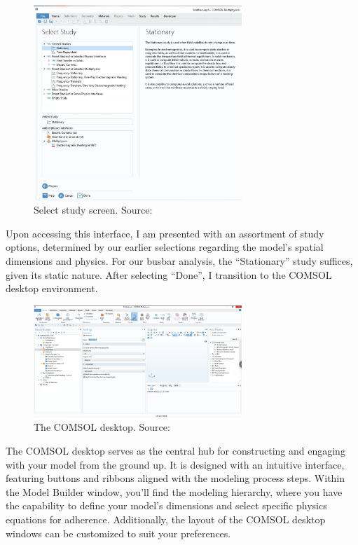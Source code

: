 \begin{figure}[H]
  \centering
  \includegraphics[width=0.7\textwidth]{Chapters/Figures/Chapter 3 Figures/Select Study.png}
  \caption{Select study screen. Source: \cite{multiphysics__modeling_nodate}}
  \label{fig:Select Study}
\end{figure}

Upon accessing this interface, I am presented with an assortment of study options, determined by our earlier selections regarding the model's spatial dimensions and physics. For our busbar analysis, the ``Stationary'' study suffices, given its static nature. After selecting ``Done'', I transition to the COMSOL desktop environment.

\begin{figure}[H]
  \centering
  \includegraphics[width=0.7\textwidth]{Chapters/Figures/Chapter 3 Figures/Initial COMSOL Desktop.png}
  \caption{The COMSOL desktop. Source: \cite{multiphysics__modeling_nodate}}
  \label{fig:The COMSOL desktop}
\end{figure}

The COMSOL desktop serves as the central hub for constructing and engaging with your model from the ground up. It is designed with an intuitive interface, featuring buttons and ribbons aligned with the modeling process steps. Within the Model Builder window, you'll find the modeling hierarchy, where you have the capability to define your model's dimensions and select specific physics equations for adherence. Additionally, the layout of the COMSOL desktop windows can be customized to suit your preferences.

